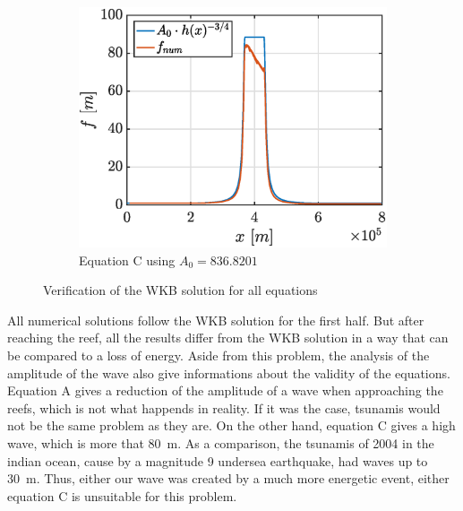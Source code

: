 \documentclass[a4paper,12pt,twoside]{article}
\begin{document}
\begin{figure}[h]
\begin{subfigure}{0.45\textwidth}
          \label{fig:tsunami-amp-B}
        \end{subfigure}\\
        \centering
        \begin{subfigure}{0.45\textwidth}
          \centering
          \includegraphics[width=\textwidth]{graphs/tsunami_amp_C.eps}
          \caption{Equation C using $A_0 = \num{836.8201}$}
          \label{fig:tsunami-amp-C}
        \end{subfigure}
        \caption{Verification of the WKB solution for all equations} %
        \label{fig:tsunami-amp}
      \end{figure}

      All numerical solutions follow the WKB solution for the first half.
      But after reaching the reef, all the results differ from the WKB solution in a way that can be compared to a loss of energy.
      Aside from this problem, the analysis of the amplitude of the wave also give informations about the validity of the equations.
      Equation A gives a reduction of the amplitude of a wave when approaching the reefs, which is not what happends in reality.
      If it was the case, tsunamis would not be the same problem as they are.
      On the other hand, equation C gives a high wave, which is more that \SI{80}{\meter}.
      As a comparison, the tsunamis of 2004 in the indian ocean, cause by a magnitude 9 undersea earthquake, had waves up to \SI{30}{\meter}. \cite{wiki:tsunami-2004}
      Thus, either our wave was created by a much more energetic event, either equation C is unsuitable for this problem.\\
\end{document}
